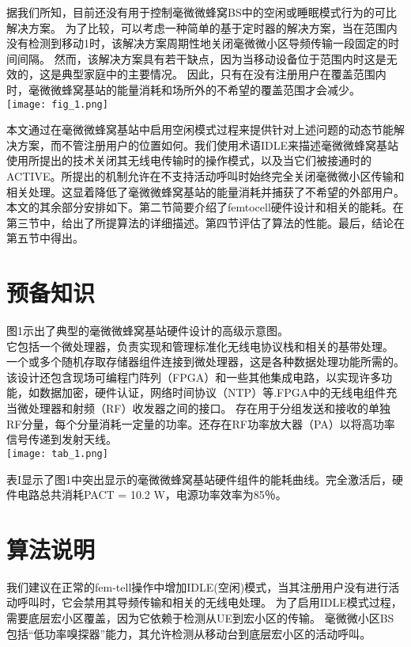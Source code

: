 \documentclass{article}
\begin{document}
据我们所知，目前还没有用于控制毫微微蜂窝BS中的空闲或睡眠模式行为的可比解决方案。
为了比较，可以考虑一种简单的基于定时器的解决方案，当在范围内没有检测到移动1时，该解决方案周期性地关闭毫微微小区导频传输一段固定的时间间隔。
然而，该解决方案具有若干缺点，因为当移动设备位于范围内时这是无效的，这是典型家庭中的主要情况。
因此，只有在没有注册用户在覆盖范围内时，毫微微蜂窝基站的能量消耗和场所外的不希望的覆盖范围才会减少。\\

\texttt{[image: fig\_1.png]}

本文通过在毫微微蜂窝基站中启用空闲模式过程来提供针对上述问题的动态节能解决方案，而不管注册用户的位置如何。我们使用术语IDLE来描述毫微微蜂窝基站使用所提出的技术关闭其无线电传输时的操作模式，以及当它们被接通时的ACTIVE。所提出的机制允许在不支持活动呼叫时始终完全关闭毫微微小区传输和相关处理。这显着降低了毫微微蜂窝基站的能量消耗并捕获了不希望的外部用户。\\

本文的其余部分安排如下。第二节简要介绍了femtocell硬件设计和相关的能耗。在第三节中，给出了所提算法的详细描述。第四节评估了算法的性能。最后，结论在第五节中得出。\\

\section{预备知识}

图1示出了典型的毫微微蜂窝基站硬件设计的高级示意图。\\

它包括一个微处理器，负责实现和管理标准化无线电协议栈和相关的基带处理。
一个或多个随机存取存储器组件连接到微处理器，这是各种数据处理功能所需的。
该设计还包含现场可编程门阵列（FPGA）和一些其他集成电路，以实现许多功能，如数据加密，硬件认证，网络时间协议（NTP）等.FPGA中的无线电组件充当微处理器和射频（RF）收发器之间的接口。
存在用于分组发送和接收的单独RF分量，每个分量消耗一定量的功率。还存在RF功率放大器（PA）以将高功率信号传递到发射天线。\\

\texttt{[image: tab\_1.png]}

表I显示了图1中突出显示的毫微微蜂窝基站硬件组件的能耗曲线。完全激活后，硬件电路总共消耗PACT = 10.2 W，电源功率效率为85％。\\

\section{算法说明}
我们建议在正常的fem-tell操作中增加IDLE(空闲)模式，当其注册用户没有进行活动呼叫时，它会禁用其导频传输和相关的无线电处理。
为了启用IDLE模式过程，需要底层宏小区覆盖，因为它依赖于检测从UE到宏小区的传输。
毫微微小区BS包括“低功率嗅探器”能力，其允许检测从移动台到底层宏小区的活动呼叫。\\
\end{document}
